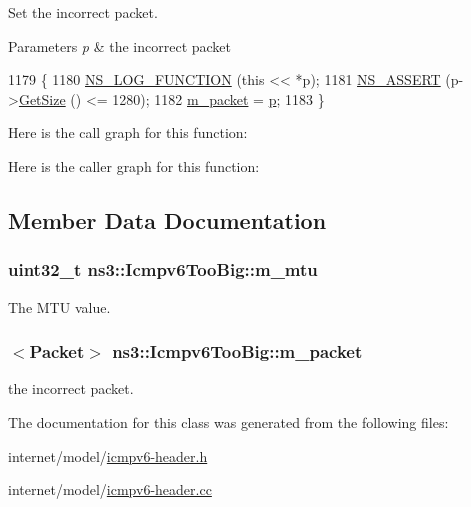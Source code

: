 Set the incorrect packet. 


\begin{DoxyParams}{Parameters}
{\em p} & the incorrect packet \\
\hline
\end{DoxyParams}

\begin{DoxyCode}
1179 \{
1180   \hyperlink{log-macros-disabled_8h_a90b90d5bad1f39cb1b64923ea94c0761}{NS\_LOG\_FUNCTION} (\textcolor{keyword}{this} << *p);
1181   \hyperlink{assert_8h_a6dccdb0de9b252f60088ce281c49d052}{NS\_ASSERT} (p->\hyperlink{classns3_1_1Packet_a462855c9929954d4301a4edfe55f4f1c}{GetSize} () <= 1280);
1182   \hyperlink{classns3_1_1Icmpv6TooBig_a51a43fcfb069dd9610f9f1de5193849c}{m\_packet} = \hyperlink{lte__link__budget_8m_ac9de518908a968428863f829398a4e62}{p};
1183 \}
\end{DoxyCode}


Here is the call graph for this function\+:




Here is the caller graph for this function\+:




\subsection{Member Data Documentation}
\subsubsection[{\texorpdfstring{m\+\_\+mtu}{m_mtu}}]{\setlength{\rightskip}{0pt plus 5cm}uint32\+\_\+t ns3\+::\+Icmpv6\+Too\+Big\+::m\+\_\+mtu\hspace{0.3cm}{\ttfamily [private]}}\hypertarget{classns3_1_1Icmpv6TooBig_ab5bfbfe51ce576538eaca6fd0ffad07d}{}\label{classns3_1_1Icmpv6TooBig_ab5bfbfe51ce576538eaca6fd0ffad07d}


The M\+TU value. 

\subsubsection[{\texorpdfstring{m\+\_\+packet}{m_packet}}]{$<${\bf Packet}$>$ ns3\+::\+Icmpv6\+Too\+Big\+::m\+\_\+packet\hspace{0.3cm}{\ttfamily [private]}}\hypertarget{classns3_1_1Icmpv6TooBig_a51a43fcfb069dd9610f9f1de5193849c}{}\label{classns3_1_1Icmpv6TooBig_a51a43fcfb069dd9610f9f1de5193849c}


the incorrect packet. 



The documentation for this class was generated from the following files\+:\begin{DoxyCompactItemize}
\item 
internet/model/\hyperlink{icmpv6-header_8h}{icmpv6-\/header.\+h}\item 
internet/model/\hyperlink{icmpv6-header_8cc}{icmpv6-\/header.\+cc}\end{DoxyCompactItemize}
